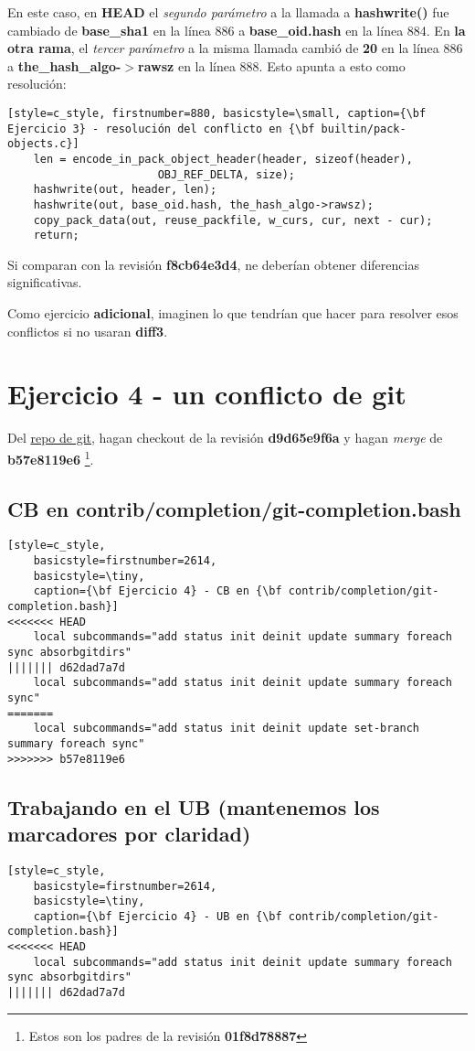 En este caso, en {\bf HEAD} el {\it segundo parámetro} a la llamada a {\bf hashwrite()} fue cambiado de {\bf base\_sha1} en
la línea 886 a {\bf base\_oid.hash} en la línea 884. En {\bf la otra rama}, el {\it tercer parámetro} a la misma llamada
cambió de {\bf 20} en la línea 886 a {\bf the\_hash\_algo-$>$rawsz} en la línea 888. Esto apunta a esto como resolución:

\begin{lstlisting}[style=c_style, firstnumber=880, basicstyle=\small, caption={\bf Ejercicio 3} - resolución del conflicto en {\bf builtin/pack-objects.c}]
	len = encode_in_pack_object_header(header, sizeof(header),
					   OBJ_REF_DELTA, size);
	hashwrite(out, header, len);
	hashwrite(out, base_oid.hash, the_hash_algo->rawsz);
	copy_pack_data(out, reuse_packfile, w_curs, cur, next - cur);
	return;
\end{lstlisting}

Si comparan con la revisión {\bf f8cb64e3d4}, ne deberían obtener diferencias significativas.

Como ejercicio {\bf adicional},  imaginen lo que tendrían que hacer para resolver esos conflictos si no usaran {\bf diff3}.

\section{Ejercicio 4 - un conflicto de git}
\label{exercise_04}
Del \hyperref[git_repo]{repo de git}, hagan checkout de la revisión {\bf d9d65e9f6a} y hagan {\it merge} de {\bf b57e8119e6}
\footnote{Estos son los padres de la revisión {\bf 01f8d78887}}.

\subsection*{CB en contrib/completion/git-completion.bash}
\begin{lstlisting}[style=c_style,
	basicstyle=firstnumber=2614,
	basicstyle=\tiny,
	caption={\bf Ejercicio 4} - CB en {\bf contrib/completion/git-completion.bash}]
<<<<<<< HEAD
	local subcommands="add status init deinit update summary foreach sync absorbgitdirs"
||||||| d62dad7a7d
	local subcommands="add status init deinit update summary foreach sync"
=======
	local subcommands="add status init deinit update set-branch summary foreach sync"
>>>>>>> b57e8119e6
\end{lstlisting}

\subsection*{Trabajando en el {\bf UB} (mantenemos los marcadores por claridad)}
\begin{lstlisting}[style=c_style,
	basicstyle=firstnumber=2614,
	basicstyle=\tiny,
	caption={\bf Ejercicio 4} - UB en {\bf contrib/completion/git-completion.bash}]
<<<<<<< HEAD
	local subcommands="add status init deinit update summary foreach sync absorbgitdirs"
||||||| d62dad7a7d
\end{lstlisting}

